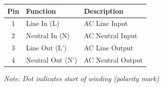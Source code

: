 \documentclass[10pt,a4paper]{article}
\begin{document}
\begin{minipage}[t]{0.48\textwidth}
\noindent{\normalsize\bfseries\textcolor{wurthred}{Schematic Symbol}}
\vspace{2mm}

\begin{center}
\end{center}
\end{minipage}
\hfill
\begin{minipage}[t]{0.48\textwidth}
\noindent{\normalsize\bfseries\textcolor{wurthred}{Pin Assignment}}
\vspace{2mm}

{\footnotesize
\begin{tabular}{|c|l|l|}
\hline
\rowcolor{tableheader}
\textbf{Pin} & \textbf{Function} & \textbf{Description} \\
\hline
1 & Line In (L) & AC Line Input \\
\hline
2 & Neutral In (N) & AC Neutral Input \\
\hline
3 & Line Out (L') & AC Line Output \\
\hline
4 & Neutral Out (N') & AC Neutral Output \\
\hline
\end{tabular}
}

\vspace{3mm}
{\scriptsize\textit{Note: Dot indicates start of winding (polarity mark)}}
\end{minipage}

\vspace{5mm}

\vspace{2mm}
\end{document}

